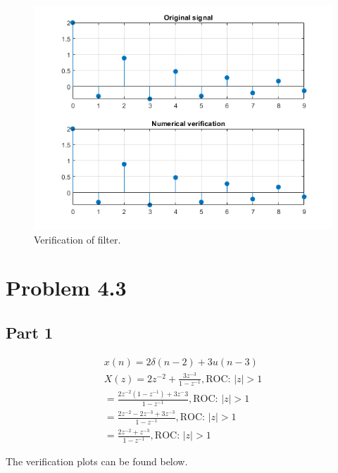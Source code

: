 \documentclass{article}
\begin{document}
\begin{figure}[H]
    \centering
    \includegraphics[width=\textwidth]{"Images/4-1 Fig2"}
    \caption{Verification of filter.}
    \label{plot:4.1.3}
\end{figure}

\section*{Problem 4.3}
\subsection*{Part 1}
\begin{gather*}
    x(n) = 2\delta(n-2) + 3u(n-3)\\
    X(z) = 2z^{-2} + \frac{3z^{-3}}{1 - z^{-1}}, \text{ROC: }|z| > 1\\
    = \frac{2z^{-2}(1 - z^{-1}) + 3z^-3}{1-z^{-1}}, \text{ROC: }|z| > 1\\
    = \frac{2z^{-2} - 2z^{-3} + 3z^{-3}}{1-z^{-1}}, \text{ROC: } |z| > 1\\
    =\frac{2z^{-2} + z^{-3}}{1-z^{-1}}, \text{ROC: } |z| > 1
\end{gather*}

The verification plots can be found below.
\end{document}
